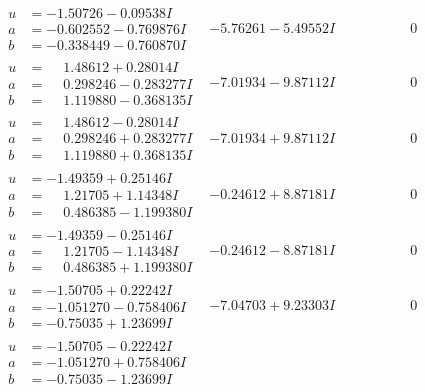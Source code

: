 \documentclass[1p]{elsarticle_modified}
\theoremstyle{definition}
\begin{document}
$$\begin{array}{c|c|c}
 \hline 
\begin{aligned}
u &= -1.50726 - 0.09538 I \\
a &= -0.602552 - 0.769876 I \\
b &= -0.338449 - 0.760870 I\end{aligned}
 & -5.76261 - 5.49552 I & \phantom{-0.000000 } 0 \\ \hline\begin{aligned}
u &= \phantom{-}1.48612 + 0.28014 I \\
a &= \phantom{-}0.298246 - 0.283277 I \\
b &= \phantom{-}1.119880 - 0.368135 I\end{aligned}
 & -7.01934 - 9.87112 I & \phantom{-0.000000 } 0 \\ \hline\begin{aligned}
u &= \phantom{-}1.48612 - 0.28014 I \\
a &= \phantom{-}0.298246 + 0.283277 I \\
b &= \phantom{-}1.119880 + 0.368135 I\end{aligned}
 & -7.01934 + 9.87112 I & \phantom{-0.000000 } 0 \\ \hline\begin{aligned}
u &= -1.49359 + 0.25146 I \\
a &= \phantom{-}1.21705 + 1.14348 I \\
b &= \phantom{-}0.486385 - 1.199380 I\end{aligned}
 & -0.24612 + 8.87181 I & \phantom{-0.000000 } 0 \\ \hline\begin{aligned}
u &= -1.49359 - 0.25146 I \\
a &= \phantom{-}1.21705 - 1.14348 I \\
b &= \phantom{-}0.486385 + 1.199380 I\end{aligned}
 & -0.24612 - 8.87181 I & \phantom{-0.000000 } 0 \\ \hline\begin{aligned}
u &= -1.50705 + 0.22242 I \\
a &= -1.051270 - 0.758406 I \\
b &= -0.75035 + 1.23699 I\end{aligned}
 & -7.04703 + 9.23303 I & \phantom{-0.000000 } 0 \\ \hline\begin{aligned}
u &= -1.50705 - 0.22242 I \\
a &= -1.051270 + 0.758406 I \\
b &= -0.75035 - 1.23699 I\end{aligned}

\end{array}$$
\end{document}
